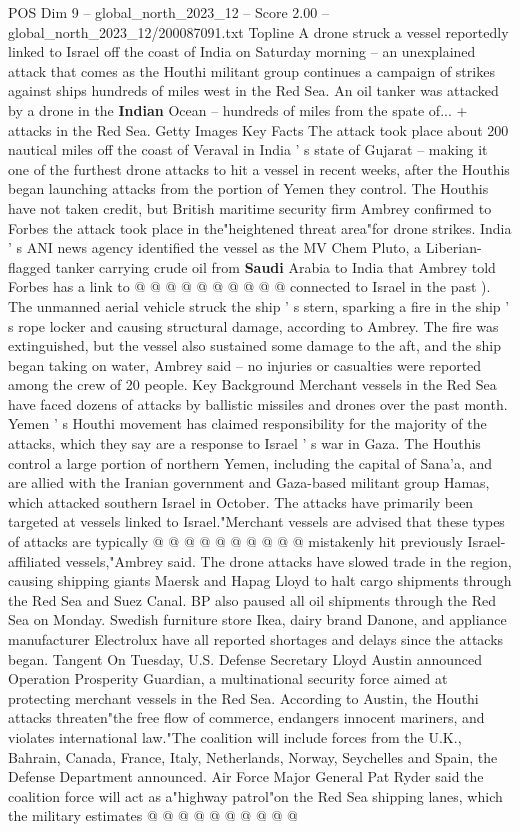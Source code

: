 \begin{textsample}{POS Dim 9 – global\_north\_2023\_12 – Score 2.00 – global\_north\_2023\_12/200087091.txt}  \label{ex:f9_pos_370}
Topline A drone struck a vessel reportedly linked to Israel off the coast of India on Saturday morning -- an unexplained attack that comes as the Houthi militant group continues a campaign of strikes against ships hundreds of miles west in the Red Sea.
An oil tanker was attacked by a drone in the \textbf{Indian} Ocean -- hundreds of miles from the spate of... + attacks in the Red Sea.
Getty Images Key Facts The attack took place about 200 nautical miles off the coast of Veraval in India ' s state of Gujarat -- making it one of the furthest drone attacks to hit a vessel in recent weeks, after the Houthis began launching attacks from the portion of Yemen they control.
The Houthis have not taken credit, but British maritime security firm Ambrey confirmed to Forbes the attack took place in the"heightened threat area"for drone strikes.
India ' s ANI news agency identified the vessel as the MV Chem Pluto, a Liberian-flagged tanker carrying crude oil from \textbf{Saudi} Arabia to India that Ambrey told Forbes has a link to @ @ @ @ @ @ @ @ @ @ connected to Israel in the past ).
The unmanned aerial vehicle struck the ship ' s stern, sparking a fire in the ship ' s rope locker and causing structural damage, according to Ambrey.
The fire was extinguished, but the vessel also sustained some damage to the aft, and the ship began taking on water, Ambrey said -- no injuries or casualties were reported among the crew of 20 people.
Key Background Merchant vessels in the Red Sea have faced dozens of attacks by ballistic missiles and drones over the past month.
Yemen ' s Houthi movement has claimed responsibility for the majority of the attacks, which they say are a response to Israel ' s war in Gaza.
The Houthis control a large portion of northern Yemen, including the capital of Sana'a, and are allied with the Iranian government and Gaza-based militant group Hamas, which attacked southern Israel in October.
The attacks have primarily been targeted at vessels linked to Israel."Merchant vessels are advised that these types of attacks are typically @ @ @ @ @ @ @ @ @ @ mistakenly hit previously Israel-affiliated vessels,"Ambrey said.
The drone attacks have slowed trade in the region, causing shipping giants Maersk and Hapag Lloyd to halt cargo shipments through the Red Sea and Suez Canal.
BP also paused all oil shipments through the Red Sea on Monday.
Swedish furniture store Ikea, dairy brand Danone, and appliance manufacturer Electrolux have all reported shortages and delays since the attacks began.
Tangent On Tuesday, U.S.
Defense Secretary Lloyd Austin announced Operation Prosperity Guardian, a multinational security force aimed at protecting merchant vessels in the Red Sea.
According to Austin, the Houthi attacks threaten"the free flow of commerce, endangers innocent mariners, and violates international law."The coalition will include forces from the U.K., Bahrain, Canada, France, Italy, Netherlands, Norway, Seychelles and Spain, the Defense Department announced.
Air Force Major General Pat Ryder said the coalition force will act as a"highway patrol"on the Red Sea shipping lanes, which the military estimates @ @ @ @ @ @ @ @ @ @

\end{textsample}
